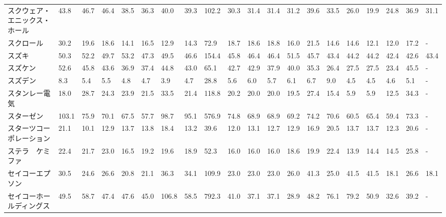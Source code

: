 \begin{tabular}{llllllllllllllllllll}
スクウェア・エニックス・ホール &   43.8 &   46.7 &      46.4 &      38.5 &       36.3 &    40.0 &    39.3 &    102.2 &    30.3 &    31.4 &   31.4 &   31.2 &    39.6 &    33.5 &    26.0 &   19.9 &   24.8 &    36.9 &   31.1 \\
スクロール           &   30.2 &   19.6 &      18.6 &      14.1 &       16.5 &    12.9 &    14.3 &     72.9 &    18.7 &    18.6 &   18.8 &   16.0 &    21.5 &    14.6 &    14.6 &   12.1 &   12.0 &    17.2 &      - \\
スズキ             &   50.3 &   52.2 &      49.7 &      53.2 &       47.3 &    49.5 &    46.6 &    154.4 &    45.8 &    46.4 &   46.4 &   51.5 &    45.7 &    43.4 &    44.2 &   44.2 &   42.4 &    42.6 &   43.4 \\
スズケン            &   52.6 &   45.8 &      43.6 &      36.9 &       37.4 &    44.8 &    43.0 &     65.1 &    42.7 &    42.9 &   37.9 &   40.0 &    35.3 &    26.4 &    27.5 &   27.5 &   23.4 &    45.5 &      - \\
スズデン            &    8.3 &    5.4 &       5.5 &       4.8 &        4.7 &     3.9 &     4.7 &     28.8 &     5.6 &     6.0 &    5.7 &    6.1 &     6.7 &     9.0 &     4.5 &    4.5 &    4.6 &     5.1 &      - \\
スタンレー電気         &   18.0 &   28.7 &      24.3 &      23.9 &       21.5 &    33.5 &    21.4 &    118.8 &    20.2 &    20.0 &   20.0 &   19.5 &    27.4 &    15.4 &     5.9 &    5.9 &   12.5 &    34.3 &      - \\
スターゼン           &  103.1 &   75.9 &      70.1 &      67.5 &       57.7 &    98.7 &    95.1 &    576.9 &    74.8 &    68.9 &   68.9 &   69.2 &    74.2 &    70.6 &    60.5 &   65.4 &   59.4 &    73.3 &      - \\
スターツコーポレーション    &   21.1 &   10.1 &      12.9 &      13.7 &       13.8 &    18.4 &    13.2 &     39.6 &    12.0 &    13.1 &   12.7 &   12.9 &    16.9 &    20.5 &    13.7 &   13.7 &   12.3 &    20.6 &      - \\
ステラ　ケミファ        &   22.4 &   21.7 &      23.0 &      16.5 &       19.2 &    19.6 &    18.9 &     52.3 &    16.0 &    16.0 &   16.0 &   18.6 &    19.9 &    22.4 &    13.9 &   14.4 &   14.5 &    25.8 &      - \\
セイコーエプソン        &   30.5 &   24.6 &      26.6 &      20.8 &       21.1 &    36.3 &    34.1 &    109.9 &    23.0 &    23.0 &   23.0 &   26.0 &    41.3 &    25.0 &    41.5 &   41.5 &   18.1 &    26.6 &   18.1 \\
セイコーホールディングス    &   49.5 &   58.7 &      47.4 &      47.6 &       45.0 &   106.8 &    58.5 &    792.3 &    41.0 &    37.1 &   37.1 &   28.9 &    48.2 &    76.1 &    79.2 &   50.9 &   32.6 &    39.2 &      - \\

\end{tabular}
